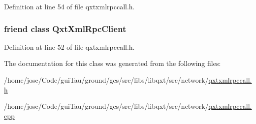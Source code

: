 Definition at line 54 of file qxtxmlrpccall.\-h.

\hypertarget{class_qxt_xml_rpc_call_aea1a90c8570af2b2d82b175cd24007d9}{
\subsubsection[{Qxt\-Xml\-Rpc\-Client}]{\setlength{\rightskip}{0pt plus 5cm}friend class {\bf Qxt\-Xml\-Rpc\-Client}\hspace{0.3cm}{\ttfamily [friend]}}}\label{class_qxt_xml_rpc_call_aea1a90c8570af2b2d82b175cd24007d9}


Definition at line 52 of file qxtxmlrpccall.\-h.



The documentation for this class was generated from the following files\-:\begin{DoxyCompactItemize}
\item 
/home/jose/\-Code/gui\-Tau/ground/gcs/src/libs/libqxt/src/network/\hyperlink{qxtxmlrpccall_8h}{qxtxmlrpccall.\-h}\item 
/home/jose/\-Code/gui\-Tau/ground/gcs/src/libs/libqxt/src/network/\hyperlink{qxtxmlrpccall_8cpp}{qxtxmlrpccall.\-cpp}\end{DoxyCompactItemize}
